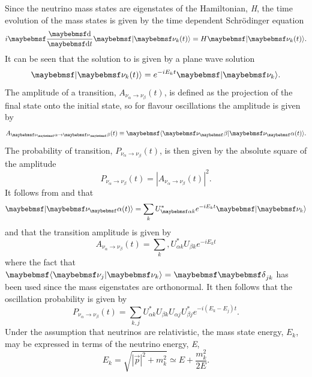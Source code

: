 Since the neutrino mass states are eigenstates of the Hamiltonian, \textit{H}, the time evolution of the mass states is given by the time dependent Schr{\"o}dinger equation
\begin{equation} \label{eqn:t.d. schrodinger}
    i \dByd{}{t}\ket{\nu_{k}(t)} = H \ket{\nu_{k}(t)}.
\end{equation}
It can be seen that the solution to  is given by a plane wave solution 
\begin{equation}\label{eqn:plane wave soln}
    \ket{\nu_{k}(t)} = e^{-iE_{k}t} \ket{\nu_{k}}.
\end{equation}
The amplitude of a transition, $A_{\nu_\alpha \rightarrow \nu_\beta}(t)$, is defined as the projection of the final state onto the initial state, so for flavour oscillations the amplitude is given by
\begin{equation}
    A_{\nu_\alpha \rightarrow \nu_\beta}(t) \isdefinedas \braket{\nu_\beta|\nu_\alpha(t)}.
\end{equation}
The probability of transition, $P_{\nu_\alpha \rightarrow \nu_\beta}(t)$, is then given by the absolute square of the amplitude
\begin{equation}
    P_{\nu_\alpha \rightarrow \nu_\beta}(t) = |A_{\nu_\alpha \rightarrow \nu_\beta}(t)|^2.
\end{equation}
It follows from  and  that
\begin{equation}
    \ket{\nu_\alpha(t)} = \sum_k U^*_{\alpha k} e^{-iE_kt}\ket{\nu_k}
\end{equation}
and that the transition amplitude is given by
\begin{equation}
    A_{\nu_\alpha \rightarrow \nu_\beta}(t) = \sum_k, U^*_{\alpha k} U_{\beta k} e^{-iE_kt}
\end{equation}
where the fact that $\braket{\nu_j|\nu_k} = \Kronecker_{jk}$ has been used since the mass eigenstates are orthonormal. It then follows that the oscillation probability is given by
\begin{equation}
    P_{\nu_\alpha \rightarrow \nu_\beta}(t) = \sum_{k,j} U^*_{\alpha k} U_{\beta k} U_{\alpha j} U^*_{\beta j} e^{-i(E_k-E_j)t}.
\end{equation}
Under the assumption that neutrinos are relativistic, the mass state energy, $E_k$, may be expressed in terms of the neutrino energy, \textit{E},
\begin{equation}
    E_k = \sqrt{|\Vec{p}|^2 + m_k^2} \simeq E + \frac{m_k^2}{2E}.
\end{equation}
